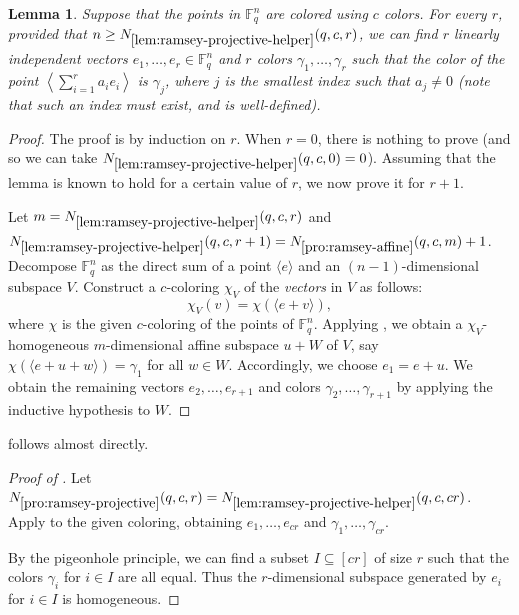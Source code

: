 \documentclass{article}
\newtheorem{lemma}[theorem]{Lemma}
\theoremstyle{definition}
\providecommand{\FF}{\mathbb{F}}
\providecommand{\Nramaff}{N_{\ref{pro:ramsey-affine}}}
\providecommand{\Nrampro}{N_{\ref{pro:ramsey-projective}}}
\providecommand{\Nramprohelp}{N_{\ref{lem:ramsey-projective-helper}}}
\begin{document}
\begin{lemma} \label{lem:ramsey-projective-helper}
Suppose that the points in $\FF_q^n$ are colored using $c$ colors. For every $r$, provided that $n \ge \Nramprohelp(q,c,r)$, we can find $r$ linearly independent vectors $e_1,\dots,e_r \in \FF_q^n$ and $r$ colors $\gamma_1,\dots,\gamma_r$ such that the color of the point $\left\langle\sum_{i=1}^r a_i e_i \right\rangle$ is $\gamma_j$, where $j$ is the smallest index such that $a_j \ne 0$ (note that such an index must exist, and is well-defined).
\end{lemma}
\begin{proof}
The proof is by induction on $r$. When $r = 0$, there is nothing to prove (and so we can take $\Nramprohelp(q,c,0) = 0$). Assuming that the lemma is known to hold for a certain value of $r$, we now prove it for $r + 1$.

Let $m = \Nramprohelp(q,c,r)$ and $\Nramprohelp(q,c,r+1) = \Nramaff(q,c,m) + 1$. Decompose $\FF_q^n$ as the direct sum of a point $\langle e \rangle$ and an $(n-1)$-dimensional subspace $V$. Construct a $c$-coloring $\chi_V$ of the \emph{vectors} in $V$ as follows:
\[
 \chi_V(v) = \chi(\langle e + v \rangle),
\]
where $\chi$ is the given $c$-coloring of the points of $\FF_q^n$. Applying , we obtain a $\chi_V$-homogeneous $m$-dimensional affine subspace $u + W$ of $V$, say $\chi(\langle e + u + w \rangle) = \gamma_1$ for all $w \in W$. Accordingly, we choose $e_1 = e + u$.
We obtain the remaining vectors $e_2,\dots,e_{r+1}$ and colors $\gamma_2,\dots,\gamma_{r+1}$ by applying the inductive hypothesis to $W$.
\end{proof}

 follows almost directly.
\begin{proof}[Proof of ]
Let $\Nrampro(q,c,r) = \Nramprohelp(q,c,cr)$. Apply  to the given coloring, obtaining $e_1,\dots,e_{cr}$ and $\gamma_1,\dots,\gamma_{cr}$.

By the pigeonhole principle, we can find a subset $I \subseteq [cr]$ of size $r$ such that the colors $\gamma_i$ for $i \in I$ are all equal. Thus the $r$-dimensional subspace generated by $e_i$ for $i \in I$ is homogeneous.
\end{proof}



\end{document}
